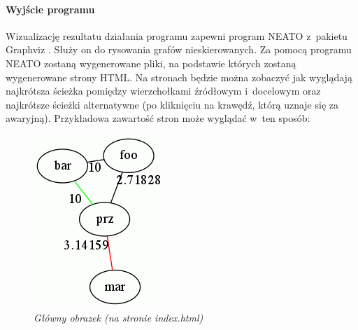 \documentclass[a4paper, 12pt]{article}
\begin{document}
\paragraph{Wyjście programu}
Wizualizację rezultatu działania programu zapewni program NEATO z~pakietu Graphviz \cite{gv}. Służy on do rysowania grafów nieskierowanych. Za pomocą programu NEATO zostaną wygenerowane pliki, na podstawie których zostaną wygenerowane strony HTML. Na stronach będzie można zobaczyć jak wyglądają najkrótsza ścieżka pomiędzy wierzchołkami źródłowym i~docelowym oraz najkrótsze ścieżki alternatywne (po kliknięciu na krawędź, którą uznaje się za awaryjną). Przykładowa zawartość stron może wyglądać w~ten sposób:

\begin{figure}[ht]
\begin{minipage}[b]{0.45\linewidth}
\centering
\includegraphics[width=\textwidth]{picture1.png}
\caption{\em Główny obrazek (na stronie index.html)}
\label{fig:picture1}
\end{minipage}

\end{figure}
\end{document}

